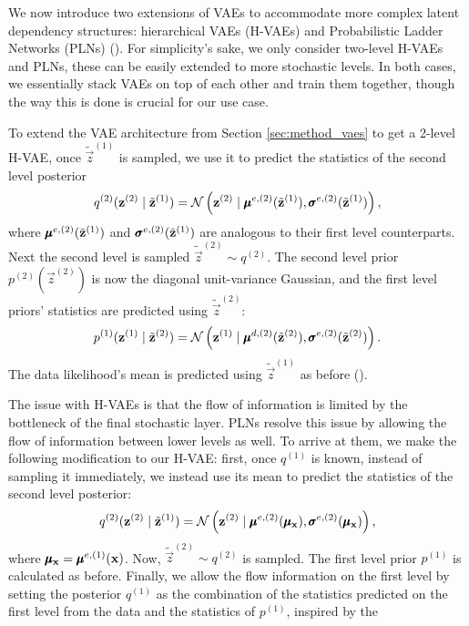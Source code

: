 \par
We now introduce two extensions of VAEs to accommodate more complex latent
dependency structures: hierarchical VAEs (H-VAEs) and Probabilistic Ladder
Networks (PLNs) (\cite{sonderby2016train}). For simplicity's sake, we only
consider two-level H-VAEs and PLNs, these can be easily extended to more
stochastic levels. In both cases, we essentially stack VAEs on top of each
other and train them together, though the way this is done is crucial for our
use case.

\par
To extend the VAE architecture from Section \ref{sec:method_vaes} to get a
2-level H-VAE, once $\tilde{\vec{z}}^{(1)}$ is sampled, we use it to predict
the statistics of the second level posterior
\[
  q^{(2)}(\mathbf{z}^{(2)} \mid \tilde{\mathbf{z}}^{(1)}) = \mathcal{N}\left( \mathbf{z}^{(2)} \mid 
  \pmb{\mu}^{e, (2)}(\tilde{\mathbf{z}}^{(1)}), \pmb{\sigma}^{e, (2)}(\tilde{\mathbf{z}}^{(1)}) \right),
\]
where $\pmb{\mu}^{e, (2)}(\tilde{\mathbf{z}}^{(1)})$ and
$\pmb{\sigma}^{e, (2)}(\tilde{\mathbf{z}}^{(1)})$ are analogous to their first level
counterparts. Next the second level is sampled $\tilde{\vec{z}}^{(2)} \sim
q^{(2)}$. The second level prior $p^{(2)}(\vec{z}^{(2)})$ is now the diagonal
unit-variance Gaussian, and the first level priors' statistics are predicted
using $\tilde{\vec{z}}^{(2)}$:
\[
  p^{(1)}(\mathbf{z}^{(1)} \mid \tilde{\mathbf{z}}^{(2)}) =
  \mathcal{N}\left( \mathbf{z}^{(1)} \mid \pmb{\mu}^{d, (2)}(\tilde{\mathbf{z}}^{(2)}),
    \pmb{\sigma}^{e, (2)}(\tilde{\mathbf{z}}^{(2)}) \right).
\] 
The data likelihood's mean is predicted using $\tilde{\vec{z}}^{(1)}$ as before
(\cite{sonderby2016train}).
\par
The issue with H-VAEs is that the flow of information is limited by the
bottleneck of the final stochastic layer. PLNs resolve this issue by allowing
the flow of information between lower levels as well. To arrive at them, we
make the following modification to our H-VAE: first, once $q^{(1)}$ is known,
instead of sampling it immediately, we instead use its mean to predict the
statistics of the second level posterior:
\[
  q^{(2)}(\mathbf{z}^{(2)} \mid \tilde{\mathbf{z}}^{(1)}) = \mathcal{N}\left( \mathbf{z}^{(2)} \mid 
  \pmb{\mu}^{e, (2)}(\pmb{\mu}_{\mathbf{x}}), \pmb{\sigma}^{e, (2)}(\pmb{\mu}_{\mathbf{x}}) \right),
\]
where $\pmb{\mu}_{\mathbf{x}} = \pmb{\mu}^{e, (1)}(\mathbf{x})$. Now, $\tilde{\vec{z}}^{(2)} \sim
q^{(2)}$ is sampled. The first level prior $p^{(1)}$ is calculated as before.
Finally, we allow the flow information on the first level by setting the
posterior $q^{(1)}$ as the combination of the statistics predicted on the first
level from the data and the statistics of $p^{(1)}$, inspired by the
